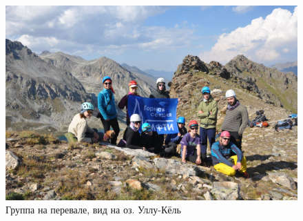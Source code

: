 \begin{figure}[h!]
	\centering
	\includegraphics[width=0.7\linewidth]{../pics/DSC_0986}
	\caption{Группа на перевале, вид на оз. Уллу-Кёль}
	\label{fig:DSC_0986}
\end{figure}

\newpage